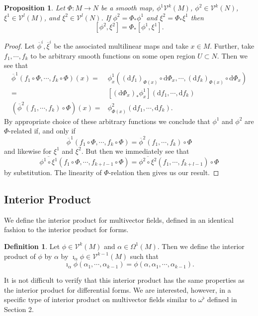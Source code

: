 \documentclass[psamsfonts,12pt]{amsart}
\newcommand\td{\mathrm{d}}
\newcommand\0{\mathbf{0}}
\theoremstyle{plain}
\newtheorem{prop}[thm]{Proposition}
\theoremstyle{definition}
\newtheorem{dfn}[thm]{Definition} %
\newcommand{\sV}{\mathcal{V}}
\begin{document}
\begin{prop}
Let $\Phi\colon M\rightarrow N$ be a smooth map, $\phi^1 \sV^k(M)$,  $\phi^2\in \sV^k(N)$, $\xi^1\in \sV^l(M)$, and $\xi^2\in \sV^l(N)$.  If $\phi^2 = \Phi_* \phi^1$ and $\xi^2=\Phi_* \xi^1$ then
\[
[\phi^2,\xi^2]=\Phi_*[\phi^1,\xi^1].
\]
\end{prop}
\begin{proof}
Let $\overline{\phi}^i,\overline{\xi}^i$ be the associated multilinear maps and take $x\in M$.  Further, take $f_1,\cdots, f_k$ to be arbitrary smooth functions on some open region $U\subset N$.  Then we see that
\begin{align*}
\overline{\phi}^1(f_1\circ \Phi,\cdots, f_k \circ \Phi)(x)=& \phi_x^1( (\td f_1)_{\Phi(x)}\circ \td \Phi_x,\cdots, (\td f_k)_{\Phi(x)}\circ \td \Phi_x)\\
=& [(\td \Phi_x)_* \phi_x^1](\td f_1,\cdots, \td f_k)\\
(\overline{\phi}^2(f_1,\cdots, f_k)\circ \Phi)(x)=& \phi^2_{\Phi(x)}(\td f_1,\cdots, \td f_k).
\end{align*}
By appropriate choice of these arbitrary functions we conclude that $\phi^1$ and $\phi^2$ are $\Phi$-related if, and only if
\[
\overline{\phi}^1(f_1\circ \Phi,\cdots, f_k\circ \Phi)= \overline{\phi}^2(f_1,\cdots, f_k)\circ \Phi
\]
and likewise for $\xi^1$ and $\xi^2$.  But then we immediately see that
\[
\overline{\phi^1\circ \xi^1}(f_1\circ \Phi,\cdots, f_{k+l-1}\circ \Phi) = \overline{\phi^2 \circ \xi^2}(f_1,\cdots, f_{k+l-1})\circ \Phi
\]
by substitution.  The linearity of $\Phi$-relation then gives us our result.
\end{proof}

\subsection{Interior Product}

We define the interior product for multivector fields, defined in an identical fashion to the interior product for forms.

\begin{dfn}
Let $\phi \in \sV^k(M)$ and $\alpha \in \Omega^1(M)$.  Then we define the interior product of $\phi$ by $\alpha$ by $\imath_\alpha \phi \in \sV^{k-1}(M)$ such that
\[
\imath_\alpha \phi(\alpha_1,\cdots, \alpha_{k-1})=\phi(\alpha, \alpha_1,\cdots, \alpha_{k-1}).
\]
\end{dfn}

It is not difficult to verify that this interior product has the same properties as the interior product for differential forms.  We are interested, however, in a specific type of interior product on multivector fields similar to $\omega^\flat$ defined in Section 2.
\end{document}
